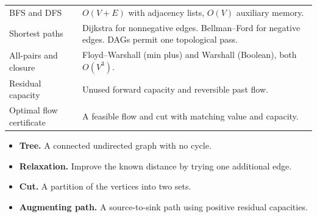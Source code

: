 \documentclass[12pt,a4paper]{article}
\renewcommand{\arraystretch}{1.45}
\begin{document}
\begin{tcolorbox}[formulabox, title={Key Concepts at a Glance}]
\renewcommand{\arraystretch}{1.35}
\noindent\begin{tabularx}{\linewidth}{B{4.5cm}Y}
BFS and DFS & $O(V+E)$ with adjacency lists, $O(V)$ auxiliary memory. \\[3pt]
Shortest paths & Dijkstra for nonnegative edges. Bellman--Ford for negative edges. DAGs permit one topological pass. \\[3pt]
All-pairs and closure & Floyd--Warshall (min plus) and Warshall (Boolean), both $O(V^3)$. \\[3pt]
Residual capacity & Unused forward capacity and reversible past flow. \\[3pt]
Optimal flow certificate & A feasible flow and cut with matching value and capacity. \\[3pt]
\end{tabularx}\par
\end{tcolorbox}

\begin{tcolorbox}[defbox, title={One-Line Definitions}]
\begin{itemize}[leftmargin=*, itemsep=3pt, topsep=4pt]
  \item \textbf{Tree.} A connected undirected graph with no cycle.
  \item \textbf{Relaxation.} Improve the known distance by trying one additional edge.
  \item \textbf{Cut.} A partition of the vertices into two sets.
  \item \textbf{Augmenting path.} A source-to-sink path using positive residual capacities.
\end{itemize}
\end{tcolorbox}
\end{document}
